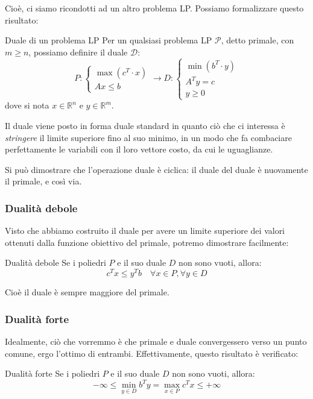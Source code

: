 \documentclass[a4paper,11pt]{article}
\begin{document}
Cioè, ci siamo ricondotti ad un altro problema LP.
Possiamo formalizzare questo risultato:
\begin{definition}{Duale di un problema LP}
	Per un qualsiasi problema LP $\mathcal{P}$, detto primale, con $m \geq n$, possiamo definire il duale $\mathcal{D}$:
	\[
		P:
		\begin{cases}
			\max(c^T \cdot x) \\ 
			Ax \leq b
		\end{cases}
	\rightarrow
		D:
		\begin{cases}
			\min(b^T \cdot y) \\ 
			A^T y = c \\
			y \geq 0
		\end{cases}
	\]
	dove si nota $x \in \mathbb{R}^n$ e $y \in \mathbb{R}^m$.
\end{definition}

Il duale viene posto in forma duale standard in quanto ciò che ci interessa è \textit{stringere} il limite superiore fino al suo minimo, in un modo che fa combaciare perfettamente le variabili con il loro vettore costo, da cui le uguaglianze.

Si può dimostrare che l'operazione duale è ciclica: il duale del duale è nuovamente il primale, e così via.

\subsubsection{Dualità debole}
Visto che abbiamo costruito il duale per avere un limite superiore dei valori ottenuti dalla funzione obiettivo del primale, potremo dimostrare facilmente:
\begin{theorem}{Dualità debole}
	Se i poliedri $P$ e il suo duale $D$ non sono vuoti, allora:
	$$ c^T x \leq y^T b \quad \forall x \in P, \forall y \in D$$
\end{theorem}
Cioè il duale è sempre maggiore del primale.

\subsubsection{Dualità forte}
Idealmente, ciò che vorremmo è che primale e duale convergessero verso un punto comune, ergo l'ottimo di entrambi.
Effettivamente, questo risultato è verificato:
\begin{theorem}{Dualità forte}
	Se i poliedri $P$ e il suo duale $D$ non sono vuoti, allora:
	$$ -\infty \leq \min_{y \in D} b^T y = \max_{x \in P} c^T x \leq +\infty $$
\end{theorem}
\end{document}
